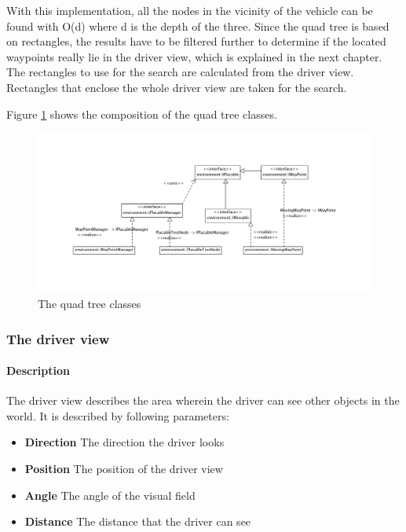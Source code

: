 \noindent With this implementation, all the nodes in the vicinity of the
vehicle can be found with O(d) where d is the depth of the three. Since
the quad tree is based on rectangles, the results have to be filtered
further to determine if the located waypoints really lie in the driver
view, which is explained in the next chapter.\\

\noindent The rectangles to use for the search are calculated from the
driver view. Rectangles that enclose the whole driver view are taken
for the search.

\noindent Figure \ref{fig:quadTreeClasses} shows the composition of the
quad tree classes.

\begin{figure}[H]
\begin{center}
\includegraphics[width=\textwidth]{images/waypointsmanager.png}
\end{center}
\caption{The quad tree classes}
\label{fig:quadTreeClasses}
\end{figure}

\subsubsection{The driver view}
\label{sec:driverView}

\paragraph{Description}

The driver view describes the area wherein the driver can see other objects in
the world. It is described by following parameters:

\begin{itemize}
\item \textbf{Direction} The direction the driver looks
\item \textbf{Position} The position of the driver view 
\item \textbf{Angle} The angle of the visual field
\item \textbf{Distance} The distance that the driver can see
\end{itemize}

